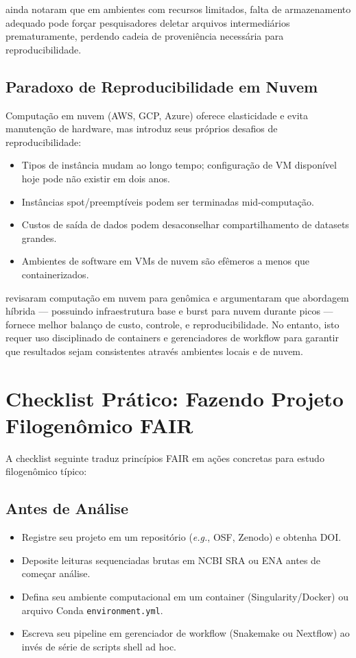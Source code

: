 \textcite{ghedira2024} ainda notaram que em ambientes com recursos limitados, falta de armazenamento adequado pode forçar pesquisadores deletar arquivos intermediários prematuramente, perdendo cadeia de proveniência necessária para reproducibilidade.

\subsection{Paradoxo de Reproducibilidade em Nuvem}

Computação em nuvem (AWS, GCP, Azure) oferece elasticidade e evita manutenção de hardware, mas introduz seus próprios desafios de reproducibilidade:

\begin{itemize}
\item Tipos de instância mudam ao longo tempo; configuração de VM disponível hoje pode não existir em dois anos.
\item Instâncias spot/preemptíveis podem ser terminadas mid-computação.
\item Custos de saída de dados podem desaconselhar compartilhamento de datasets grandes.
\item Ambientes de software em VMs de nuvem são efêmeros a menos que containerizados.
\end{itemize}

\textcite{langmead2018} revisaram computação em nuvem para genômica e argumentaram que abordagem híbrida --- possuindo infraestrutura base e burst para nuvem durante picos --- fornece melhor balanço de custo, controle, e reproducibilidade. No entanto, isto requer uso disciplinado de containers e gerenciadores de workflow para garantir que resultados sejam consistentes através ambientes locais e de nuvem.

\section{Checklist Prático: Fazendo Projeto Filogenômico FAIR}

A checklist seguinte traduz princípios FAIR em ações concretas para estudo filogenômico típico:

\subsection{Antes de Análise}

\begin{itemize}
\item [ ] Registre seu projeto em um repositório (\textit{e.g.}, OSF, Zenodo) e obtenha DOI.
\item [ ] Deposite leituras sequenciadas brutas em NCBI SRA ou ENA antes de começar análise.
\item [ ] Defina seu ambiente computacional em um container (Singularity/Docker) ou arquivo Conda \texttt{environment.yml}.
\item [ ] Escreva seu pipeline em gerenciador de workflow (Snakemake ou Nextflow) ao invés de série de scripts shell ad hoc.
\end{itemize}

